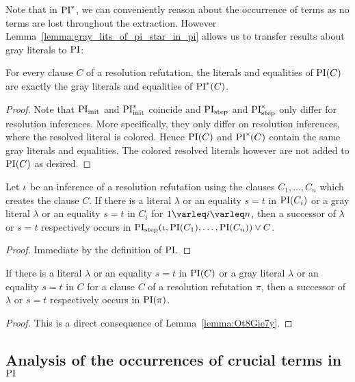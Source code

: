 Note that in $\operatorname{PI}^*$, we can conveniently reason about the occurrence of terms as no terms are lost throughout the extraction.
However Lemma~\ref{lemma:gray_lits_of_pi_star_in_pi} allows us to transfer results about gray literals to $\operatorname{PI}$:

\begin{lemma}
	\label{lemma:gray_lits_of_pi_star_in_pi}
	For every clause $C$ of a resolution refutation,
	the literals and equalities of $\operatorname{PI}(C)$ are exactly the gray literals and equalities of $\operatorname{PI}^*(C)$.
\end{lemma}
\begin{proof}
	Note that $\operatorname{PI}_{\mathrm{init}}$ and $\operatorname{PI}_{\mathrm{init}}^*$ coincide and $\operatorname{PI}_{\mathrm{step}}$ and $\operatorname{PI}_{\mathrm{step}}^*$ only differ for resolution inferences.
	More specifically, they only differ on resolution inferences, where the resolved literal is colored.
	Hence $\operatorname{PI}(C)$ and $\operatorname{PI}^*(C)$ contain the same gray literals and equalities.
	The colored resolved literals however are not added to $\operatorname{PI}(C)$ as desired.
\end{proof}


\begin{lemma}
	\label{lemma:Ot8Gie7y}
	Let $\iota$ be an inference of a resolution refutation using the clauses $C_1, \dots, C_n$ which creates the clause $C$.
	If there is a literal $\lambda$ or an equality $s=t$ in $\operatorname{PI}(C_i)$ or a gray literal $\lambda$ or an equality $s=t$ in $C_i$ for $1 \varleq i \varleq n$, 
	then a successor of $\lambda$ or $s=t$ respectively occurs in $\operatorname{PI}_{\mathrm{step}}(\iota, \operatorname{PI}(C_1), \dots, \operatorname{PI}(C_n)) \lor C$.
\end{lemma}
\begin{proof}
	Immediate by the definition of $\operatorname{PI}$.
\end{proof}

\begin{corr}
	\label{lemma:gray_lits_and_eq_all_in_PI}
	If there is a literal $\lambda$ or an equality $s=t$ in $\operatorname{PI}(C)$ or a gray literal $\lambda$ or an equality $s=t$ in $C$ for a clause $C$ of a resolution refutation $\pi$,
	then a successor of $\lambda$ or $s=t$ respectively occurs in $\operatorname{PI}(\pi)$.
\end{corr}
\begin{proof}
	This is a direct consequence of Lemma~\ref{lemma:Ot8Gie7y}.
\end{proof}


\subsection{Analysis of the occurrences of crucial terms in $\operatorname{PI}$}

